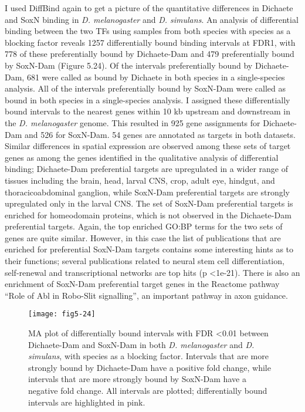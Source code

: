 I used DiffBind again to get a picture of the quantitative differences in Dichaete and SoxN binding in \emph{D. melanogaster} and \emph{D. simulans}. An analysis of differential binding between the two TFs using samples from both species with species as a blocking factor reveals 1257 differentially bound binding intervals at FDR1, with 778 of these preferentially bound by Dichaete-Dam and 479 preferentially bound by SoxN-Dam (Figure 5.24). Of the intervals preferentially bound by Dichaete-Dam, 681 were called as bound by Dichaete in both species in a single-species analysis. All of the intervals preferentially bound by SoxN-Dam were called as bound in both species in a single-species analysis. I assigned these differentially bound intervals to the nearest genes within 10 kb upstream and downstream in the \emph{D. melanogaster} genome. This resulted in 925 gene assignments for Dichaete-Dam and 526 for SoxN-Dam. 54 genes are annotated as targets in both datasets. Similar differences in spatial expression are observed among these sets of target genes as among the genes identified in the qualitative analysis of differential binding; Dichaete-Dam preferential targets are upregulated in a wider range of tissues including the brain, head, larval CNS, crop, adult eye, hindgut, and thoracicoabdominal ganglion, while SoxN-Dam preferential targets are strongly upregulated only in the larval CNS. The set of SoxN-Dam preferential targets is enriched for homeodomain proteins, which is not observed in the Dichaete-Dam preferential targets. Again, the top enriched GO:BP terms for the two sets of genes are quite similar. However, in this case the list of publications that are enriched for preferential SoxN-Dam targets contains some interesting hints as to their functions; several publications related to neural stem cell differentiation, self-renewal and transcriptional networks are top hits (p \textless 1e-21). There is also an enrichment of SoxN-Dam preferential target genes in the Reactome pathway “Role of Abl in Robo-Slit signalling”, an important pathway in axon guidance.

\begin{figure}[ht]
\centering
\texttt{[image: fig5-24]}
\caption[Differentially bound intervals with FDR \textless 0.01 between Dichaete-Dam and SoxN-Dam in both \emph{D. melanogaster} and \emph{D. simulans}]{MA plot of differentially bound intervals with FDR \textless 0.01 between Dichaete-Dam and SoxN-Dam in both \emph{D. melanogaster} and \emph{D. simulans}, with species as a blocking factor. Intervals that are more strongly bound by Dichaete-Dam have a positive fold change, while intervals that are more strongly bound by SoxN-Dam have a negative fold change. All intervals are plotted; differentially bound intervals are highlighted in pink.}
\label{Figure 5.24}
\end{figure}

